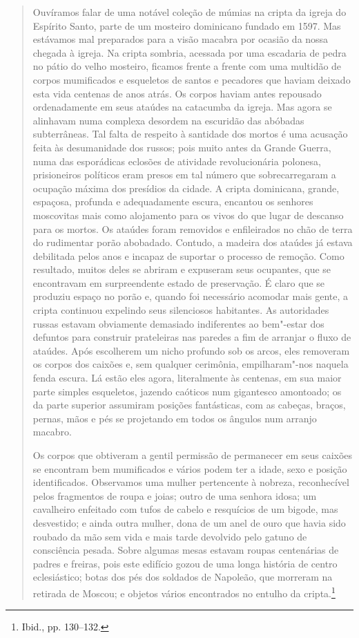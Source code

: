 \begin{quote}
Ouvíramos falar de uma notável coleção de múmias na cripta da igreja do
Espírito Santo, parte de um mosteiro dominicano fundado em 1597. Mas
estávamos mal preparados para a visão macabra por ocasião da nossa
chegada à igreja. Na cripta sombria, acessada por uma escadaria de pedra
no pátio do velho mosteiro, ficamos frente a frente com uma multidão de
corpos mumificados e esqueletos de santos e pecadores que haviam deixado
esta vida centenas de anos atrás. Os corpos haviam antes repousado
ordenadamente em seus ataúdes na catacumba da igreja. Mas agora se
alinhavam numa complexa desordem na escuridão das abóbadas subterrâneas.
Tal falta de respeito à santidade dos mortos é uma acusação feita às
desumanidade dos russos; pois muito antes da Grande Guerra, numa das
esporádicas eclosões de atividade revolucionária polonesa, prisioneiros
políticos eram presos em tal número que sobrecarregaram a ocupação
máxima dos presídios da cidade. A cripta dominicana, grande, espaçosa,
profunda e adequadamente escura, encantou os senhores moscovitas mais
como alojamento para os vivos do que lugar de descanso para os mortos.
Os ataúdes foram removidos e enfileirados no chão de terra do rudimentar
porão abobadado. Contudo, a madeira dos ataúdes já estava debilitada
pelos anos e incapaz de suportar o processo de remoção. Como resultado,
muitos deles se abriram e expuseram seus ocupantes, que se encontravam
em surpreendente estado de preservação. É claro que se produziu espaço
no porão e, quando foi necessário acomodar mais gente, a cripta
continuou expelindo seus silenciosos habitantes. As autoridades russas
estavam obviamente demasiado indiferentes ao bem"-estar dos defuntos para
construir prateleiras nas paredes a fim de arranjar o fluxo de ataúdes.
Após escolherem um nicho profundo sob os arcos, eles removeram os corpos
dos caixões e, sem qualquer cerimônia, empilharam"-nos naquela fenda
escura. Lá estão eles agora, literalmente às centenas, em sua maior
parte simples esqueletos, jazendo caóticos num gigantesco amontoado; os
da parte superior assumiram posições fantásticas, com as cabeças,
braços, pernas, mãos e pés se projetando em todos os ângulos num arranjo
macabro.

Os corpos que obtiveram a gentil permissão de permanecer em seus caixões
se encontram bem mumificados e vários podem ter a idade, sexo e posição
identificados. Observamos uma mulher pertencente à nobreza, reconhecível
pelos fragmentos de roupa e joias; outro de uma senhora idosa; um
cavalheiro enfeitado com tufos de cabelo e resquícios de um bigode, mas
desvestido; e ainda outra mulher, dona de um anel de ouro que havia sido
roubado da mão sem vida e mais tarde devolvido pelo gatuno de
consciência pesada. Sobre algumas mesas estavam roupas centenárias de
padres e freiras, pois este edifício gozou de uma longa história de
centro eclesiástico; botas dos pés dos soldados de Napoleão, que
morreram na retirada de Moscou; e objetos vários encontrados no entulho
da cripta.\footnote{Ibid., pp. 130--132.}
\end{quote}

